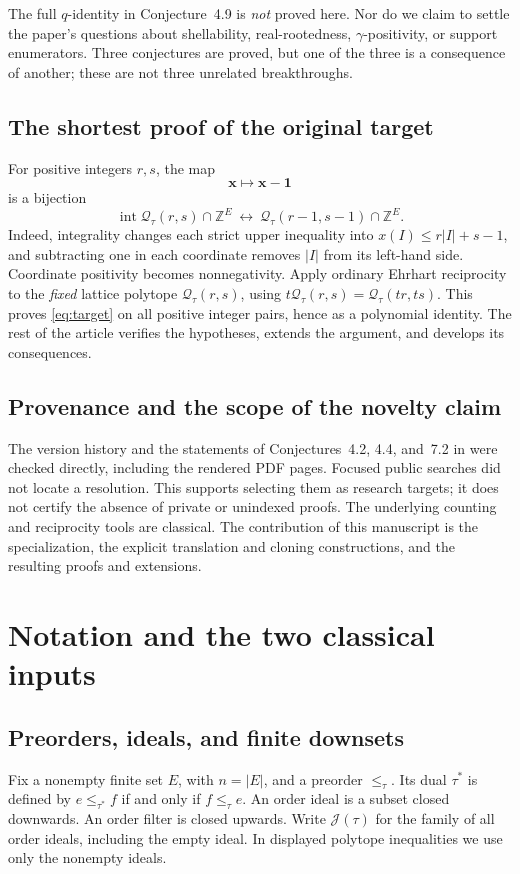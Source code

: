 \documentclass[11pt,letterpaper]{article}
\theoremstyle{definition}
\newcommand{\Z}{\mathbb Z}
\newcommand{\one}{\mathbf 1}
\newcommand{\xvec}{\mathbf x}
\newcommand{\JJ}{\mathcal J}
\newcommand{\QQ}{\mathcal Q}
\DeclareMathOperator{\Int}{int}
\newcommand{\card}[1]{\lvert #1\rvert}
\begin{document}
The full $q$-identity in Conjecture~4.9 is \emph{not} proved here. Nor do we
claim to settle the paper's questions about shellability, real-rootedness,
$\gamma$-positivity, or support enumerators. Three conjectures are proved, but
one of the three is a consequence of another; these are not three unrelated
breakthroughs.

\subsection{The shortest proof of the original target}
For positive integers $r,s$, the map
\[
 \xvec\longmapsto\xvec-\one
\]
is a bijection
\begin{equation}\label{eq:short-bijection}
 \Int\QQ_\tau(r,s)\cap\Z^E
 \ \longleftrightarrow\
 \QQ_\tau(r-1,s-1)\cap\Z^E.
\end{equation}
Indeed, integrality changes each strict upper inequality into
$x(I)\leq r\card I+s-1$, and subtracting one in each coordinate removes
$\card I$ from its left-hand side. Coordinate positivity becomes
nonnegativity. Apply ordinary Ehrhart reciprocity to the \emph{fixed} lattice
polytope $\QQ_\tau(r,s)$, using
$t\QQ_\tau(r,s)=\QQ_\tau(tr,ts)$. This proves \eqref{eq:target} on all
positive integer pairs, hence as a polynomial identity. The rest of the
article verifies the hypotheses, extends the argument, and develops its
consequences.

\subsection{Provenance and the scope of the novelty claim}
The version history and the statements of Conjectures~4.2, 4.4, and~7.2 in
\cite{AC26} were checked directly, including the rendered PDF pages.
Focused public searches did not locate a resolution. This supports selecting
them as research targets; it does not certify the absence of private or
unindexed proofs. The underlying counting and reciprocity tools are classical.
The contribution of this manuscript is the specialization, the explicit
translation and cloning constructions, and the resulting proofs and extensions.

\section{Notation and the two classical inputs}\label{sec:tools}

\subsection{Preorders, ideals, and finite downsets}
Fix a nonempty finite set $E$, with $n=\card E$, and a preorder
$\leq_\tau$. Its dual $\tau^*$ is defined by
$e\leq_{\tau^*}f$ if and only if $f\leq_\tau e$. An order ideal is a subset
closed downwards. An order filter is closed upwards. Write $\JJ(\tau)$ for
the family of all order ideals, including the empty ideal. In displayed
polytope inequalities we use only the nonempty ideals.
\end{document}
